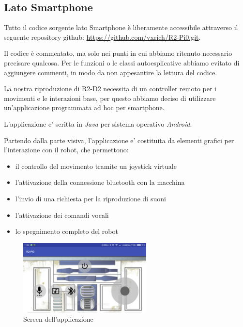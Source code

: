 \documentclass[12pt]{article}
\newcommand{\imgszland}{0.6\textwidth}
\begin{document}
\subsection{Lato Smartphone}

\begin{minipage}{\linewidth}
Tutto il codice sorgente lato Smartphone è liberamente accessibile attraverso il seguente repository github: \url{https://github.com/vxrich/R2-Pi0.git}.
\end{minipage}

Il codice è commentato, ma solo nei punti in cui abbiamo ritenuto necessario precisare qualcosa. Per le funzioni o le classi autoesplicative abbiamo evitato di aggiungere commenti, in modo da non appesantire la lettura del codice.

La nostra riproduzione di R2-D2 necessita di un controller remoto per i movimenti e le interazioni base,
per questo abbiamo deciso di utilizzare un'applicazione programmata ad hoc per smartphone.

L'applicazione e' scritta in \emph{Java} per sistema operativo \emph{Android}.

\medskip

Partendo dalla parte visiva, l'applicazione e' costituita da elementi grafici per l'interazione con il robot, che permettono:
\begin{itemize}
\item il controllo del movimento tramite un joystick virtuale
\item l'attivazione della connessione bluetooth con la macchina
\item l'invio di una richiesta per la riproduzione di suoni
\item l'attivazione dei comandi vocali
\item lo spegnimento completo del robot
\end{itemize}

\begin{figure}[h]
\includegraphics[width=\imgszland]{screenapp}
\centering
\caption{Screen dell'applicazione}
\label{fig:screen}
\end{figure}
\end{document}
